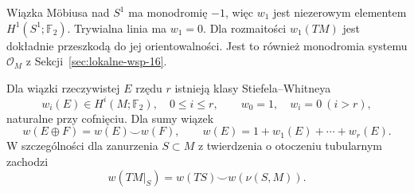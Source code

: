 \begin{przyklad}
Wiązka Möbiusa nad $S^1$
ma monodromię $-1$,
więc $w_1$ jest
niezerowym elementem
$H^1(S^1;\mathbb F_2)$.
Trywialna linia ma $w_1=0$.
Dla rozmaitości
$w_1(TM)$ jest dokładnie
przeszkodą do jej
orientowalności.
Jest to również
monodromia systemu
$\mathcal O_M$
z Sekcji~\ref{sec:lokalne-wsp-16}.
\end{przyklad}

\begin{twierdzenie}
\label{thm:wi-klasy-16}
Dla wiązki rzeczywistej
$E$ rzędu $r$ istnieją
klasy Stiefela--Whitneya
\[
 w_i(E)\in H^i(M;\mathbb F_2),
 \quad 0\leq i\leq r,\qquad
 w_0=1,\quad w_i=0\ (i>r),
\]
naturalne przy cofnięciu.
Dla sumy wiązek
\[
 w(E\oplus F)=w(E)\smile w(F),
 \qquad w(E)=1+w_1(E)+\cdots+w_r(E).
\]
W szczególności dla zanurzenia
$S\subset M$ z twierdzenia o otoczeniu tubularnym
zachodzi
\begin{equation}\label{eq:w-normalne-16}
 w(TM|_S)=w(TS)\smile w(\nu(S,M)).
\end{equation}
\end{twierdzenie}
